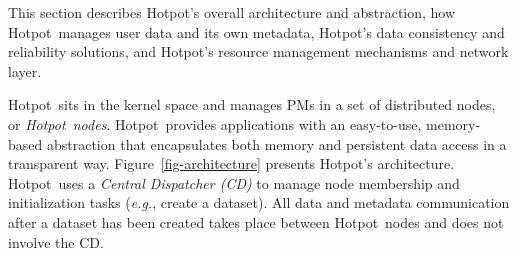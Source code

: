 \documentclass[sigconf]{acmart}
\renewcommand{\em}{\it}
\newcommand{\eg}{\textit{e.g.}}
\newcommand{\dsnvm}{DSPM}
\newcommand{\nvm}{PM}
\newcommand{\hotpot}{Hotpot}
\newcommand{\cd}{CD}
\providecommand{\DIFdelbegin}{} %
\providecommand{\DIFdelend}{} %
\begin{document}
{
This section describes \hotpot's overall architecture and abstraction,
how \hotpot\ manages user data and its own metadata, 
\hotpot's data consistency and reliability solutions,
and \hotpot's resource management mechanisms and network layer.
\fi

\DIFdelbegin %


\DIFdelend \hotpot\ sits in the kernel space and manages \nvm{}s in a set of distributed nodes, or {\em \hotpot\ nodes}.
\hotpot\ provides applications with an easy-to-use, memory-based abstraction that encapsulates 
both memory and persistent data access in a transparent way.
Figure~\ref{fig-architecture} presents \hotpot's architecture.
\hotpot\ uses a {\em Central Dispatcher (\cd)} 
to manage node membership and initialization tasks (\eg, create a dataset).
All data and metadata communication after a dataset has been created takes place between \hotpot\ nodes and does not involve the \cd.

\DIFdelbegin %

}
\end{document}
